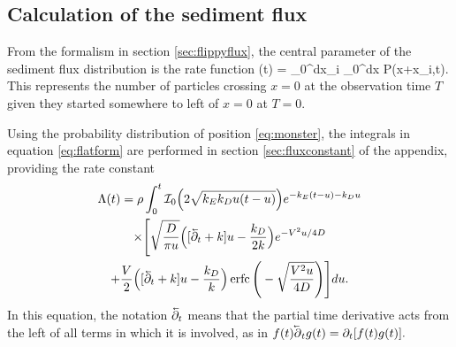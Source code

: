 \subsection{Calculation of the sediment flux}

From the formalism in section \ref{sec:flippyflux}, the central parameter of the sediment flux distribution is the rate function
\be \Lambda(t) = \rho \int_0^\infty dx_i \int_0^\infty dx P(x+x_i,t). \label{eq:flatform}\ee
This represents the number of particles crossing $x=0$ at the observation time $T$ given they started somewhere to left of $x=0$ at $T=0$.

Using the probability distribution of position \ref{eq:monster}, the integrals in equation \ref{eq:flatform} are performed in section \ref{sec:fluxconstant} of the appendix, providing the rate constant
\begin{multline} 
\Lambda(t) = \rho \int_0^t \mathcal{I}_0\Big(2\sqrt{k_Ek_Du(t-u)}\Big)e^{-k_E(t-u)-k_D u} \\
\times \Bigg[\sqrt{\frac{D}{\pi u}}\Big([\cev{\partial_t} + k]u-\frac{k_D}{2 k}\Big)e^{-V^2 u/4D} \\+ \frac{V}{2}\Big([\cev{\partial_t} + k]u -\frac{k_D}{k}\Big) \erfc\Bigg(-\sqrt{\frac{V^2 u}{4D}}\Bigg)\Bigg] du. \label{eq:fluxy}
\end{multline}
In this equation, the notation $\cev{\partial_t}$ means that the partial time derivative acts from the left of all terms in which it is involved, as in $f(t)\cev{\partial}_t g(t) = \partial_t [f(t)g(t)].$

